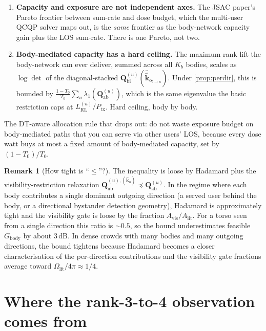 \documentclass[11pt,a4paper]{article}
\theoremstyle{definition}
\newtheorem{remark}[remark]{Remark}
\newcommand{\Qabs}{\mathbf{Q}_{\mathrm{ab}}}
\newcommand{\kout}{\hat{\bm{k}}_{\mathrm{o}}}
\newcommand{\Qbist}{\mathbf{Q}_{\mathrm{bi}}}
\begin{document}
\begin{enumerate}[leftmargin=1.6em,itemsep=2pt]
\item \textbf{Capacity and exposure are not independent axes.}  The
JSAC paper's Pareto frontier between sum-rate and dose budget,
which the multi-user QCQP solver maps out, is the \emph{same}
frontier as the body-network capacity gain plus the LOS sum-rate.
There is one Pareto, not two.
\item \textbf{Body-mediated capacity has a hard ceiling.}  The
maximum rank lift the body-network can ever deliver, summed across
all $K_b$ bodies, scales as $\log\det$ of the diagonal-stacked
$\Qbist^{(u)}(\hat\kout_{b\to u})$.  Under \cref{prop:perdir},
this is bounded by $\frac{1-T_0}{T_0}\sum_u\lambda_1(\Qabs^{(u)})$,
which is the same eigenvalue the basic restriction caps at
$L_{\mathrm{RL}}^{(u)}/P_{\mathrm{tx}}$.  Hard ceiling, body by
body.
\end{enumerate}

The DT-aware allocation rule that drops out: do not waste exposure
budget on body-mediated paths that you can serve via other users'
LOS, because every dose watt buys at most a fixed amount of
body-mediated capacity, set by $(1-T_0)/T_0$.

\begin{remark}[How tight is ``$\le$''?]\label{rem:pareto-tight}
The inequality is loose by Hadamard plus the visibility-restriction
relaxation $\Qabs^{(u),(\kout)}\preceq\Qabs^{(u)}$.  In the regime
where each body contributes a single dominant outgoing direction (a
served user behind the body, or a directional bystander
detection geometry), Hadamard is approximately tight and the
visibility gate is loose by the fraction $A_{\mathrm{vis}}/A_{\mathrm{lit}}$.
For a torso seen from a single direction this ratio is $\sim 0.5$,
so the bound underestimates feasible $G_{\mathrm{body}}$ by about
$3$\,dB.  In dense crowds with many bodies and many outgoing
directions, the bound tightens because Hadamard becomes a closer
characterisation of the per-direction contributions and the
visibility gate fractions average toward
$\Omega_{\mathrm{lit}}/4\pi\approx 1/4$.
\end{remark}

\section{Where the rank-3-to-4 observation comes from}\label{sec:rankexplained}
\end{document}
